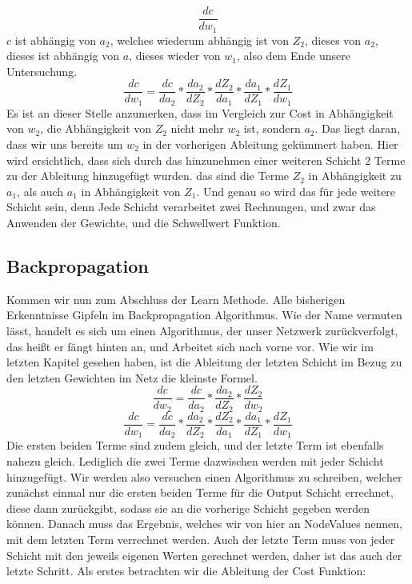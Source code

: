\documentclass[12pt]{article}
\begin{document}
$$\frac{dc}{dw_1}$$
$c$ ist abhängig von $a_2$, welches wiederum abhängig ist von $Z_2$, dieses von $a_2$, dieses ist abhängig von $a$, dieses wieder von $w_1$, also dem Ende unsere Untersuchung.
$$\frac{ dc }{ dw_{ 1 } }=
\frac{ dc }{ da_{ 2 } }*
\frac{ da_{ 2 } }{ dZ_{ 2 } }*
\frac{ dZ_{ 2 } }{ da_{ 1 } }*
\frac{ da_{ 1 } }{ dZ_{ 1 } }*
\frac{ dZ_{ 1 } }{ dw_{ 1 } }$$
Es ist an dieser Stelle anzumerken, dass im Vergleich zur Cost in Abhängigkeit von $w_2$, die Abhängigkeit von $Z_2$ nicht mehr $w_2$ ist, sondern $a_2$. Das liegt daran, dass wir uns bereits um $w_2$ in der vorherigen Ableitung gekümmert haben.
Hier wird ersichtlich, dass sich durch das hinzunehmen einer weiteren Schicht 2 Terme zu der Ableitung hinzugefügt wurden. das sind die Terme $Z_2$ in Abhängigkeit zu $a_1$, als auch $a_1$ in Abhängigkeit von $Z_1$. 
Und genau so wird das für jede weitere Schicht sein, denn Jede Schicht verarbeitet zwei Rechnungen, und zwar das Anwenden der Gewichte, und die Schwellwert Funktion.\subsection{ Backpropagation}Kommen wir nun zum Abschluss der Learn Methode. Alle bisherigen Erkenntnisse Gipfeln im Backpropagation Algorithmus. Wie der Name vermuten lässt, handelt es sich um einen Algorithmus, der unser Netzwerk zurückverfolgt, das heißt er fängt hinten an, und Arbeitet sich nach vorne vor. 
Wie wir im letzten Kapitel gesehen haben, ist die Ableitung der letzten Schicht im Bezug zu den letzten Gewichten im Netz die kleinste Formel. 
$$\frac{ dc }{ dw_{ 2 } }=
\frac{ dc }{ da_{ 2 } }*
\frac{ da_{ 2 } }{ dZ_{ 2 } }*
\frac{ dZ_{ 2 } }{ dw_{ 2 } }$$
$$\frac{ dc }{ dw_{ 1 } }=
\frac{ dc }{ da_{ 2 } }*
\frac{ da_{ 2 } }{ dZ_{ 2 } }*
\frac{ dZ_{ 2 } }{ da_{ 1 } }*
\frac{ da_{ 1 } }{ dZ_{ 1 } }*
\frac{ dZ_{ 1 } }{ dw_{ 1 } }$$
Die ersten beiden Terme sind zudem gleich, und der letzte Term ist ebenfalls nahezu gleich. Lediglich die zwei Terme dazwischen werden mit jeder Schicht hinzugefügt. Wir werden also versuchen einen Algorithmus zu schreiben, welcher zunächst einmal nur die ersten beiden Terme für die Output Schicht errechnet, diese dann zurückgibt, sodass sie an die vorherige Schicht gegeben werden können. Danach muss das Ergebnis, welches wir von hier an NodeValues nennen, mit dem letzten Term verrechnet werden. Auch der letzte Term muss von jeder Schicht mit den jeweils eigenen Werten gerechnet werden, daher ist das auch der letzte Schritt. Als erstes betrachten wir die Ableitung der Cost Funktion:
\end{document}
